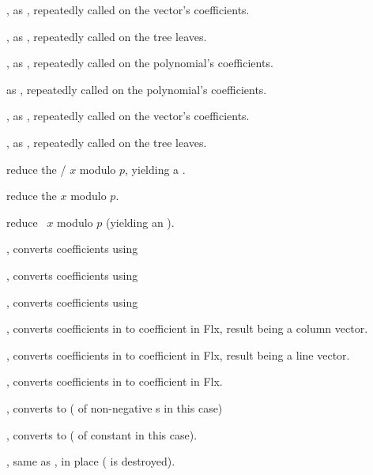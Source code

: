 , as , repeatedly
called on the vector's coefficients.

, as , repeatedly
called on the tree leaves.

, as ,
repeatedly called on the polynomial's coefficients.

 as ,
repeatedly called on the polynomial's coefficients.

, as ,
repeatedly called on the vector's coefficients.

, as ,
repeatedly called on the tree leaves.

 reduce the /
$x$ modulo $p$, yielding a .

 reduce the  $x$ modulo $p$.

 reduce ~$x$ modulo $p$
(yielding an ).

, converts coefficients using 

, converts coefficients using 

, converts coefficients using 

, converts coefficients in 
to coefficient in Flx, result being a column vector.

, converts coefficients in 
to coefficient in Flx, result being a line vector.


, converts coefficients in 
to coefficient in Flx.


, converts to  ( of non-negative
s in this case)

, converts to  ( of constant
 in this case).

, same as , in place
( is destroyed).

